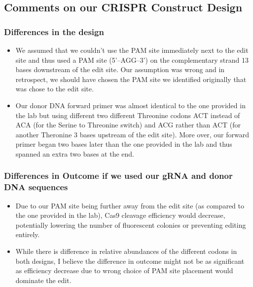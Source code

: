 \documentclass[12pt,a4paper]{article}
\begin{document}
\subsection{Comments on our CRISPR Construct Design}
\subsubsection{Differences in the design}
\begin{itemize}
    \item We assumed that we couldn't use the PAM site immediately next to the edit site
          and thus used a PAM site (5'--AGG--3') on the complementary strand 13 bases
          downstream of the edit site. Our assumption was wrong and in retrospect, we
          should have chosen the PAM site we identified originally that was chose to the
          edit site.
    \item Our donor DNA forward primer was almost identical to the one provided in the
          lab but using different two different Threonine codons ACT instead of ACA (for
          the Serine to Threonine switch) and ACG rather than ACT (for another Theronine
          3 bases upstream of the edit site). More over, our forward primer began two
          bases later than the one provided in the lab and thus spanned an extra two
          bases at the end.
\end{itemize}
\subsubsection{Differences in Outcome if we used our gRNA and donor DNA sequences}
\begin{itemize}
    \item Due to our PAM site being further away from the edit site (as compared to the
          one provided in the lab), Cas9 cleavage efficiency would decrease, potentially
          lowering the number of fluorescent colonies or preventing editing entirely.
    \item While there is difference in relative abundances of the different codons in
          both designs, I believe the difference in outcome might not be as significant
          as efficiency decrease due to wrong choice of PAM site placement would dominate
          the edit.
\end{itemize}
\end{document}
